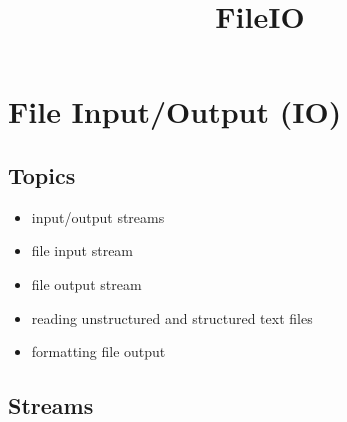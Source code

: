 \documentclass[11pt]{article}
\title{FileIO}
\providecommand{\tightlist}{%
      \setlength{\itemsep}{0pt}\setlength{\parskip}{0pt}}
\begin{document}
    
    \maketitle
    
    

    
    \hypertarget{file-inputoutput-io}{%
\section{File Input/Output (IO)}\label{file-inputoutput-io}}

\hypertarget{topics}{%
\subsection{Topics}\label{topics}}

\begin{itemize}
\tightlist
\item
  input/output streams
\item
  file input stream
\item
  file output stream
\item
  reading unstructured and structured text files
\item
  formatting file output
\end{itemize}

    \hypertarget{streams}{%
\subsection{Streams}\label{streams}}
\end{document}
